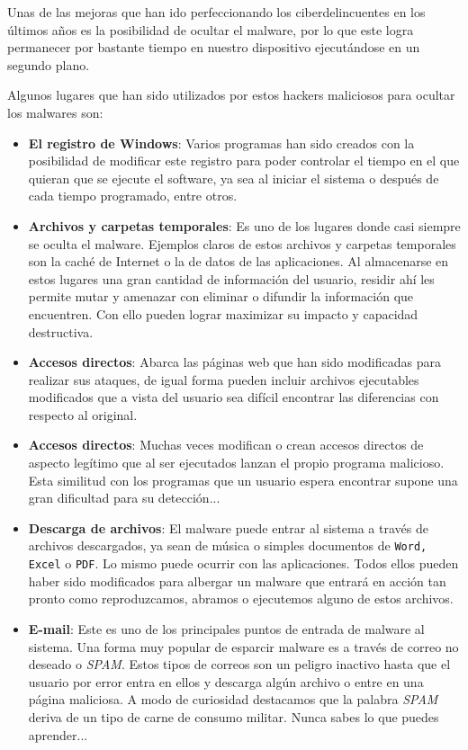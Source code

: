 \documentclass[12pt]{article}
\newcommand{\newpar} {
    \vskip 0.5cm
}
\begin{document}
            \newpar

            Unas de las mejoras que han ido perfeccionando los ciberdelincuentes en los últimos años es la posibilidad de ocultar el malware, por lo que este logra permanecer por bastante tiempo en nuestro dispositivo ejecutándose en un segundo plano.

            \newpar

            Algunos lugares que han sido utilizados por estos hackers maliciosos para ocultar los malwares son:


            \begin{itemize}
                \item \textbf{El registro de Windows}: Varios programas han sido creados con la posibilidad de modificar este registro para poder controlar el tiempo en el que quieran que se ejecute el software, ya sea al iniciar el sistema o después de cada tiempo programado, entre otros.
                \item \textbf{Archivos y carpetas temporales}: Es uno de los lugares donde casi siempre se oculta el malware. Ejemplos claros de estos archivos y carpetas temporales son la caché de Internet o la de datos de las aplicaciones. Al almacenarse en estos lugares una gran cantidad de información del usuario, residir ahí les permite mutar y amenazar con eliminar o difundir la información que encuentren. Con ello pueden lograr maximizar su impacto y capacidad destructiva.
                \item \textbf{Accesos directos}: Abarca las páginas web que han sido modificadas para realizar sus ataques, de igual forma pueden incluir archivos ejecutables modificados que a vista del usuario sea difícil encontrar las diferencias con respecto al original.
                \item \textbf{Accesos directos}: Muchas veces modifican o crean accesos directos de aspecto legítimo que al ser ejecutados lanzan el propio programa malicioso. Esta similitud con los programas que un usuario espera encontrar supone una gran dificultad para su detección...
                \item \textbf{Descarga de archivos}: El malware puede entrar al sistema a través de archivos descargados, ya sean de música o simples documentos de \texttt{Word, Excel} o \texttt{PDF}. Lo mismo puede ocurrir con las aplicaciones. Todos ellos pueden haber sido modificados para albergar un malware que entrará en acción tan pronto como reproduzcamos, abramos o ejecutemos alguno de estos archivos.
                \item \textbf{E-mail}: Este es uno de los principales puntos de entrada de malware al sistema. Una forma muy popular de esparcir malware es a través de correo no deseado o \textit{SPAM}. Estos tipos de correos son un peligro inactivo hasta que el usuario por error entra en ellos y descarga algún archivo o entre en una página maliciosa. A modo de curiosidad destacamos que la palabra \textit{SPAM} deriva de un tipo de carne de consumo militar. Nunca sabes lo que puedes aprender...
            \end{itemize}
\end{document}

